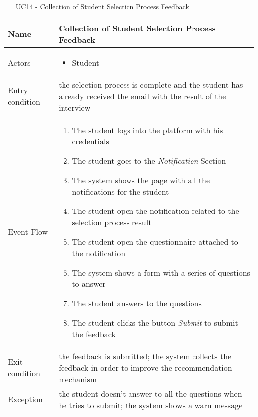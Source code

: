 				
				\begin{table} [H]
					\centering
					\begin{itemize}
						\item [UC14] - Collection of Student Selection Process Feedback
					\end{itemize}
					
					\begin{tabular}{|| P{7.5cm} | P{7.5cm} ||}
						\hline
						Name & Collection of Student Selection Process Feedback \\
						\hline
						Actors & \parbox{5cm}{\begin{itemize}
								\item Student
							\end{itemize}
						} \\
						\hline
						Entry condition & the selection process is complete and the student has already received the email with the result of the interview \\
						\hline
						Event Flow & \parbox{5cm}{\begin{enumerate}[label=\alpha]
								\item The student logs into the platform with his credentials
								\item The student goes to the \textit{Notification} Section
								\item The system shows the page with all the notifications for the student
								\item The student open the notification related to the selection process result 
								\item The student open the questionnaire attached to the notification
								\item The system shows a form with a series of questions to answer
								\item The student answers to the questions 
								\item The student clicks the button \textit{Submit} to submit the feedback
						\end{enumerate}} \\
						\hline 
						Exit condition & the feedback is submitted; the system collects the feedback in order to improve the recommendation 
						mechanism \\
						\hline
						Exception & the student doesn't answer to all the questions when he tries to submit; the system shows a warn message \\
						\hline
					\end{tabular}
				\end{table}
				
